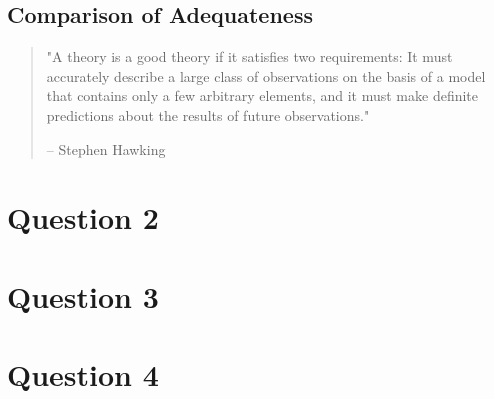 \documentclass[10pt,a4paper]{article}
\begin{document}
\subsection*{Comparison of Adequateness}
\begin{quote}
	"A theory is a good theory if it satisfies two requirements: It must accurately describe a large class of observations on the basis of a model that contains only a few arbitrary elements, and it must make definite predictions about the results of future observations."

	-- Stephen Hawking
\end{quote}

\section*{Question 2}
\section*{Question 3}
\section*{Question 4}
\end{document}
